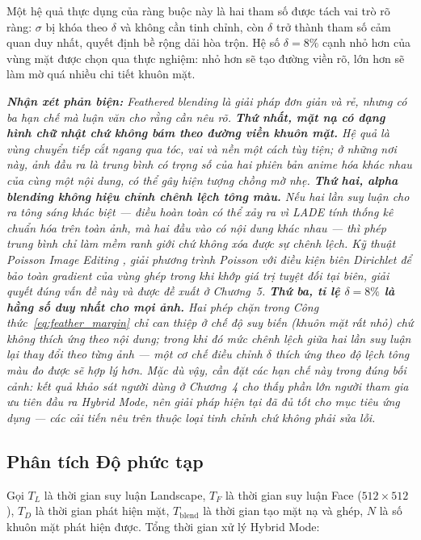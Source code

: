 Một hệ quả thực dụng của ràng buộc này là hai tham số được tách vai trò rõ ràng: $\sigma$ bị khóa theo $\delta$ và không cần tinh chỉnh, còn $\delta$ trở thành tham số cảm quan duy nhất, quyết định bề rộng dải hòa trộn. Hệ số $\delta = 8\%$ cạnh nhỏ hơn của vùng mặt được chọn qua thực nghiệm: nhỏ hơn sẽ tạo đường viền rõ, lớn hơn sẽ làm mờ quá nhiều chi tiết khuôn mặt.

\medskip
\noindent\textit{\textbf{Nhận xét phản biện:} Feathered blending là giải pháp đơn giản và rẻ, nhưng có ba hạn chế mà luận văn cho rằng cần nêu rõ. \textbf{Thứ nhất, mặt nạ có dạng hình chữ nhật chứ không bám theo đường viền khuôn mặt.} Hệ quả là vùng chuyển tiếp cắt ngang qua tóc, vai và nền một cách tùy tiện; ở những nơi này, ảnh đầu ra là trung bình có trọng số của hai phiên bản anime hóa \textit{khác nhau} của cùng một nội dung, có thể gây hiện tượng chồng mờ nhẹ. \textbf{Thứ hai, alpha blending không hiệu chỉnh chênh lệch tông màu.} Nếu hai lần suy luận cho ra tông sáng khác biệt --- điều hoàn toàn có thể xảy ra vì LADE tính thống kê chuẩn hóa trên toàn ảnh, mà hai đầu vào có nội dung khác nhau --- thì phép trung bình chỉ làm mềm ranh giới chứ không xóa được sự chênh lệch. Kỹ thuật Poisson Image Editing \cite{Perez2003Poisson}, giải phương trình Poisson với điều kiện biên Dirichlet để bảo toàn gradient của vùng ghép trong khi khớp giá trị tuyệt đối tại biên, giải quyết đúng vấn đề này và được đề xuất ở Chương~5. \textbf{Thứ ba, tỉ lệ $\delta = 8\%$ là hằng số duy nhất cho mọi ảnh.} Hai phép chặn trong Công thức~\eqref{eq:feather_margin} chỉ can thiệp ở chế độ suy biến (khuôn mặt rất nhỏ) chứ không thích ứng theo nội dung; trong khi đó mức chênh lệch giữa hai lần suy luận lại thay đổi theo từng ảnh --- một cơ chế điều chỉnh $\delta$ thích ứng theo độ lệch tông màu đo được sẽ hợp lý hơn. Mặc dù vậy, cần đặt các hạn chế này trong đúng bối cảnh: kết quả khảo sát người dùng ở Chương~4 cho thấy phần lớn người tham gia ưu tiên đầu ra Hybrid Mode, nên giải pháp hiện tại đã đủ tốt cho mục tiêu ứng dụng --- các cải tiến nêu trên thuộc loại tinh chỉnh chứ không phải sửa lỗi.}

\subsection{Phân tích Độ phức tạp}
\label{subsec:hybrid_complexity}

Gọi $T_L$ là thời gian suy luận Landscape, $T_F$ là thời gian suy luận Face ($512 \times 512$), $T_D$ là thời gian phát hiện mặt, $T_{\text{blend}}$ là thời gian tạo mặt nạ và ghép, $N$ là số khuôn mặt phát hiện được. Tổng thời gian xử lý Hybrid Mode:

